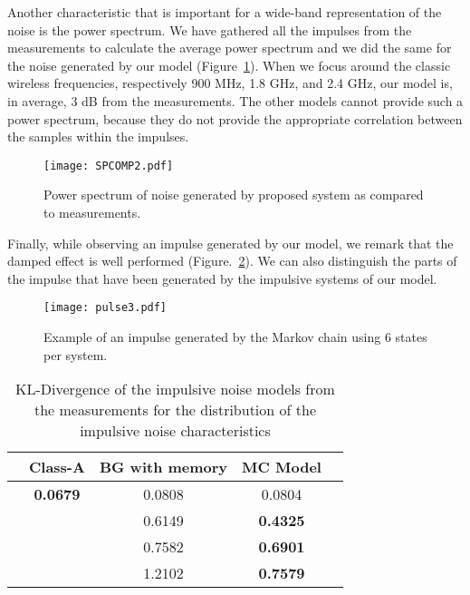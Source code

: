 \documentclass[journal]{IEEEtran}
\begin{document}
Another characteristic that is important for a wide-band representation of the noise is the power spectrum. We have gathered all the impulses from the measurements to calculate the average power spectrum and we did the same for the noise generated by our model (Figure~\ref{spcomp}). When we focus around the classic wireless frequencies, respectively 900 MHz, 1.8 GHz, and 2.4 GHz, our model is, in average, 3 dB from the measurements. The other models cannot provide such a power spectrum, because they do not provide the appropriate correlation between the samples within the impulses.
\begin{figure}
\texttt{[image: SPCOMP2.pdf]}
  \caption{Power spectrum of noise generated by proposed system as compared to measurements.}\label{spcomp}
\end{figure}
Finally, while observing an impulse generated by our model, we remark that the damped effect is well performed (Figure.~\ref{impulse}). We can also distinguish the parts of the impulse that have been generated by the impulsive systems of our model.
\begin{center}
\begin{figure}
\texttt{[image: pulse3.pdf]}
  \caption{Example of an impulse generated by the Markov chain using 6 states per system.}\label{impulse}
\end{figure}
\end{center}

\begin{table}
  \centering
  \begin{tabular}{|c|c|c|c|c|}
   \hline
\centering{} & Class-A & BG with memory & MC Model \\\hline
    \centering{Samples value} & \textbf{0.0679} & 0.0808 & 0.0804 \\\hline
    \centering{Impulse duration} & \centering{}  & 0.6149 & \textbf{0.4325} \\\hline
    \centering{IAT} & \centering{}  & 0.7582 & \textbf{0.6901} \\\hline
    \centering{Impulse amplitude} & \centering{}  & 1.2102 & \textbf{0.7579} \\
    \hline
  \end{tabular}
  \caption{KL-Divergence of the impulsive noise models from the measurements for the distribution of the impulsive noise characteristics}\label{KLD}
\end{table}
\end{document}
